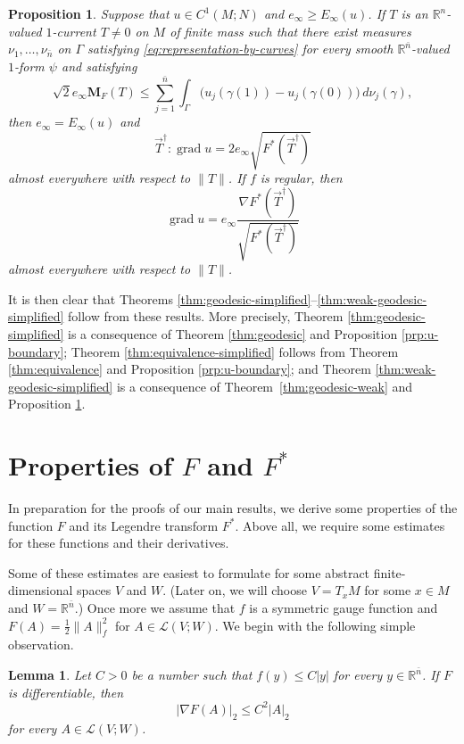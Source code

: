 \documentclass[10pt,a4paper]{amsart}
\newcommand{\R}{\mathbb{R}}
\newcommand{\M}{\mathbf{M}}
\newcommand{\ndim}{{\bar{n}}}
\newcommand{\Lin}{\mathcal{L}}
\DeclareMathOperator{\grad}{grad}
\newtheorem{lemma}[theorem]{Lemma}
\newtheorem{proposition}[theorem]{Proposition}
\begin{document}
\begin{proposition} \label{prp:consistency}
Suppose that $u \in C^1(M; N)$ and $e_\infty \ge E_\infty(u)$. If $T$ is an
$\R^n$-valued $1$-current $T \neq 0$ on $M$ of finite mass such that there exist measures
$\nu_1, \dotsc, \nu_\ndim$ on $\Gamma$
satisfying \eqref{eq:representation-by-curves} for every smooth $\R^\ndim$-valued
$1$-form $\psi$ and satisfying
\[
\sqrt{2}e_\infty \M_F(T) \le \sum_{j = 1}^\ndim \int_\Gamma \bigl(u_j(\gamma(1)) - u_j(\gamma(0))\bigr) \, d\nu_j(\gamma),
\]
then $e_\infty = E_\infty(u)$ and
\[
\vec{T}^\dagger : \grad u = 2 e_\infty \sqrt{F^*(\vec{T}^\dagger)}
\]
almost everywhere with respect to $\|T\|$. If $f$ is regular, then
\[
\grad u = e_\infty \frac{\nabla F^*(\vec{T}^\dagger)}{\sqrt{F^*(\vec{T}^\dagger)}}
\]
almost everywhere with respect to $\|T\|$.
\end{proposition}

It is then clear that Theorems \ref{thm:geodesic-simplified}--\ref{thm:weak-geodesic-simplified} follow from these results. More precisely, Theorem
\ref{thm:geodesic-simplified} is a consequence of
Theorem \ref{thm:geodesic} and Proposition \ref{prp:u-boundary};
Theorem \ref{thm:equivalence-simplified} follows from Theorem \ref{thm:equivalence} and Proposition \ref{prp:u-boundary}; and Theorem \ref{thm:weak-geodesic-simplified} is
a consequence of Theorem~\ref{thm:geodesic-weak} and Proposition \ref{prp:consistency}.








\section{Properties of $F$ and $F^*$} \label{sct:properties-of-F}

In preparation for the proofs of our main results, we derive some properties of
the function $F$ and its Legendre transform $F^*$. Above all, we require some estimates for
these functions and their derivatives.

Some of these estimates are easiest to formulate for some abstract finite-dimensional spaces $V$ and $W$. (Later on, we will choose $V = T_x M$ for some $x \in M$
and $W = \R^\ndim$.) Once more we assume that $f$ is a symmetric gauge function and $F(A) = \frac{1}{2} \|A\|_f^2$ for $A \in \Lin(V; W)$. We begin with the following simple observation.

\begin{lemma} \label{lem:F-gradient-estimate}
Let $C > 0$ be a number such that $f(y) \le C|y|$ for every $y \in \R^\ndim$.
If $F$ is differentiable, then
\[
|\nabla F(A)|_2 \le C^2 |A|_2
\]
for every $A \in \Lin(V; W)$.
\end{lemma}
\end{document}
